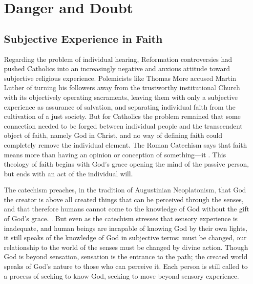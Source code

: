 \section{Danger and Doubt}

\subsection{Subjective Experience in Faith}

Regarding the problem of individual hearing, Reformation controversies had 
pushed Catholics into an increasingly negative and anxious attitude toward 
subjective religious experience.
Polemicists like Thomas More accused Martin Luther of turning his followers 
away from the trustworthy institutional Church with its objectively operating 
sacraments, leaving them with only a subjective experience as assurance of 
salvation, and separating individual faith from the cultivation of a just 
society.%
    \Autocite[ch.~4]{Schreiner:Certainty}
But for Catholics the problem remained that some connection needed to be forged 
between individual people and the transcendent object of faith, namely God in 
Christ, and no way of defining faith could completely remove the individual 
element.
The Roman Catechism says that faith means more than having an opinion or 
conception of something---it .%
    \Autocite
    [15: .]
    {Catholic:Catechismus1614}
This theology of faith begins with God's grace opening the mind of the passive 
person, but ends with an act of the individual will.

The catechism preaches, in the tradition of Augustinian Neoplatonism, that God 
the creator is above all created things that can be perceived through the 
senses, and that therefore humans cannot come to the knowledge of God without 
the gift of God's grace.
.%
    \Autocite
    [18: .]
    {Catholic:Catechismus1614}
But even as the catechism stresses that sensory experience is inadequate, and 
human beings are incapable of knowing God by their own lights, it still speaks 
of the knowledge of God in subjective terms:  must be 
changed, our relationship to the world of the senses must be changed by divine 
action.
Though God is beyond sensation, sensation is the entrance to the path; the 
created world speaks of God's nature to those who can perceive it.
Each person is still called to a process of seeking to know God, seeking to 
move beyond sensory experience.


